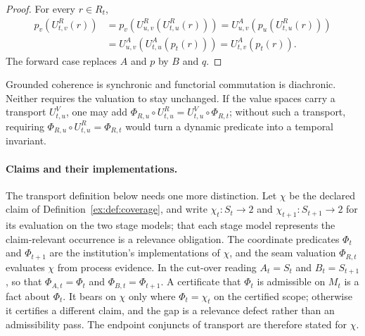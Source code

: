 \documentclass[11pt]{article}
\theoremstyle{definition}
\begin{document}
\begin{proof}
For every $r \in R_t$,
\begin{align*}
p_v(U^R_{t,v}(r))
&=p_v(U^R_{u,v}(U^R_{t,u}(r)))
=U^A_{u,v}(p_u(U^R_{t,u}(r)))\\
&=U^A_{u,v}(U^A_{t,u}(p_t(r)))
=U^A_{t,v}(p_t(r)).
\end{align*}
The forward case replaces $A$ and $p$ by $B$ and $q$.
\end{proof}

Grounded coherence is synchronic and functorial commutation is diachronic. Neither requires the valuation to stay unchanged. If the value spaces carry a transport $U^V_{t,u}$, one may add $\Phi_{R,u} \circ U^R_{t,u}=U^V_{t,u} \circ \Phi_{R,t}$; without such a transport, requiring $\Phi_{R,u} \circ U^R_{t,u}=\Phi_{R,t}$ would turn a dynamic predicate into a temporal invariant.

\paragraph{Claims and their implementations.} The transport definition below needs one more distinction. Let $\chi$ be the declared claim of Definition~\ref{ex:def:coverage}, and write $\chi_t:S_t\to2$ and $\chi_{t+1}:S_{t+1}\to2$ for its evaluation on the two stage models; that each stage model represents the claim-relevant occurrence is a relevance obligation. The coordinate predicates $\Phi_t$ and $\Phi_{t+1}$ are the institution's implementations of $\chi$, and the seam valuation $\Phi_{R,t}$ evaluates $\chi$ from process evidence. In the cut-over reading $A_t=S_t$ and $B_t=S_{t+1}$, so that $\Phi_{A,t}=\Phi_t$ and $\Phi_{B,t}=\Phi_{t+1}$. A certificate that $\Phi_t$ is admissible on $M_t$ is a fact about $\Phi_t$. It bears on $\chi$ only where $\Phi_t=\chi_t$ on the certified scope; otherwise it certifies a different claim, and the gap is a relevance defect rather than an admissibility pass. The endpoint conjuncts of transport are therefore stated for $\chi$.
\end{document}

